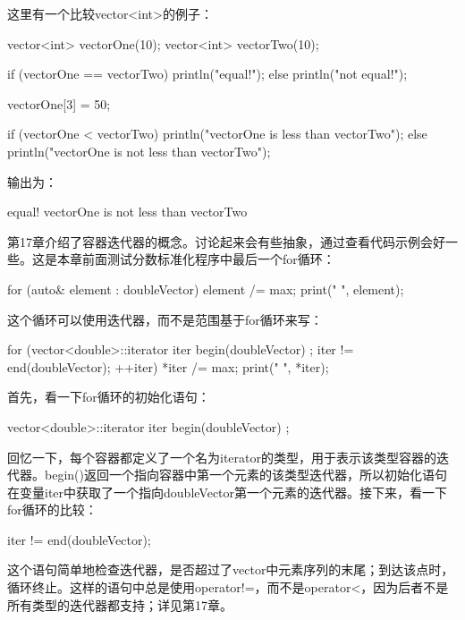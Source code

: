 这里有一个比较vector<int>的例子：

\begin{cpp}
vector<int> vectorOne(10);
vector<int> vectorTwo(10);

if (vectorOne == vectorTwo) { println("equal!"); }
else { println("not equal!"); }

vectorOne[3] = 50;

if (vectorOne < vectorTwo) { println("vectorOne is less than vectorTwo"); }
else { println("vectorOne is not less than vectorTwo"); }
\end{cpp}

输出为：

\begin{shell}
equal!
vectorOne is not less than vectorTwo
\end{shell}


第17章介绍了容器迭代器的概念。讨论起来会有些抽象，通过查看代码示例会好一些。这是本章前面测试分数标准化程序中最后一个for循环：

\begin{cpp}
for (auto& element : doubleVector) {
    element /= max;
    print("{} ", element);
}
\end{cpp}

这个循环可以使用迭代器，而不是范围基于for循环来写：

\begin{cpp}
for (vector<double>::iterator iter { begin(doubleVector) };
iter != end(doubleVector); ++iter) {
    *iter /= max;
    print("{} ", *iter);
}
\end{cpp}

首先，看一下for循环的初始化语句：

\begin{cpp}
vector<double>::iterator iter { begin(doubleVector) };
\end{cpp}

回忆一下，每个容器都定义了一个名为iterator的类型，用于表示该类型容器的迭代器。begin()返回一个指向容器中第一个元素的该类型迭代器，所以初始化语句在变量iter中获取了一个指向doubleVector第一个元素的迭代器。接下来，看一下for循环的比较：

\begin{cpp}
iter != end(doubleVector);
\end{cpp}

这个语句简单地检查迭代器，是否超过了vector中元素序列的末尾；到达该点时，循环终止。这样的语句中总是使用operator!=，而不是operator<，因为后者不是所有类型的迭代器都支持；详见第17章。

